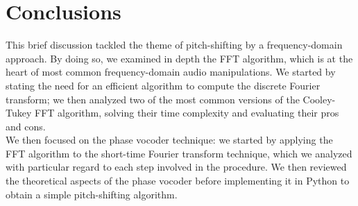 \documentclass[class=article,crop=false]{standalone}
\begin{document}
	\section{Conclusions}
	This brief discussion tackled the theme of pitch-shifting by a frequency-domain approach. By doing so, we examined in depth the FFT algorithm, which is at the heart of most common frequency-domain audio manipulations. We started by stating the need for an efficient algorithm to compute the discrete Fourier transform; we then analyzed two of the most common versions of the Cooley-Tukey FFT algorithm, solving their time complexity and evaluating their pros and cons.\\
	We then focused on the phase vocoder technique: we started by applying the FFT algorithm to the short-time Fourier transform technique, which we analyzed with particular regard to each step involved in the procedure. We then reviewed the theoretical aspects of the phase vocoder before implementing it in Python to obtain a simple pitch-shifting algorithm.
\end{document}
